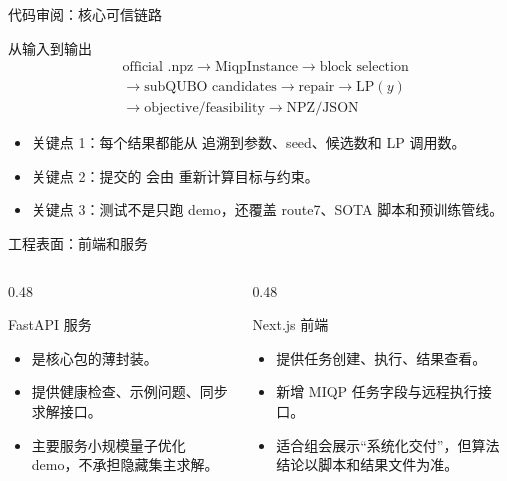 \documentclass[aspectratio=169]{beamer}
\begin{document}
\begin{frame}{代码审阅：核心可信链路}
\small
\begin{block}{从输入到输出}
\[
\begin{aligned}
&\text{official .npz}\rightarrow \text{MiqpInstance}\rightarrow \text{block selection}\\
&\rightarrow \text{subQUBO candidates}\rightarrow \text{repair}\rightarrow \text{LP}(y)\\
&\rightarrow \text{objective/feasibility}\rightarrow \text{NPZ/JSON}
\end{aligned}
\]
\end{block}
\begin{itemize}
  \item 关键点 1：每个结果都能从  追溯到参数、seed、候选数和 LP 调用数。
  \item 关键点 2：提交的  会由  重新计算目标与约束。
  \item 关键点 3：测试不是只跑 demo，还覆盖 route7、SOTA 脚本和预训练管线。
\end{itemize}
\end{frame}

\begin{frame}{工程表面：前端和服务}
\small
\begin{columns}[T,onlytextwidth]
\begin{column}{0.48\textwidth}
\begin{block}{FastAPI 服务}
\begin{itemize}
  \item {} 是核心包的薄封装。
  \item 提供健康检查、示例问题、同步求解接口。
  \item 主要服务小规模量子优化 demo，不承担隐藏集主求解。
\end{itemize}
\end{block}
\end{column}
\begin{column}{0.48\textwidth}
\begin{block}{Next.js 前端}
\begin{itemize}
  \item {} 提供任务创建、执行、结果查看。
  \item 新增 MIQP 任务字段与远程执行接口。
  \item 适合组会展示“系统化交付”，但算法结论以脚本和结果文件为准。
\end{itemize}
\end{block}
\end{column}
\end{columns}
\end{frame}
\end{document}
